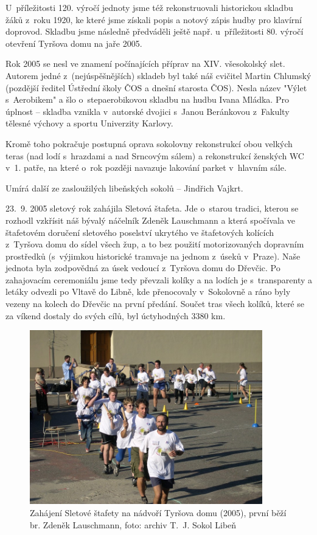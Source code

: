 \documentclass[a5paper, 11pt, twoside]{article}
\begin{document}
U~příležitosti
120. výročí jednoty jsme též rekonstruovali historickou skladbu žáků
z~roku 1920, ke které jsme získali popis a notový zápis hudby pro klavírní
doprovod. Skladbu jsme následně předváděli ještě např. u~příležitosti
80. výročí otevření Tyršova domu na jaře 2005.

Rok 2005 se nesl ve znamení počínajících příprav na XIV. všesokolský
slet. Autorem jedné z~(nejúspěšnějších) skladeb byl také náš cvičitel
Martin Chlumský (pozdější ředitel Ústřední školy ČOS a dnešní starosta
ČOS). Nesla název "Výlet s~Aerobikem" a šlo o~stepaerobikovou skladbu
na hudbu Ivana Mládka. Pro úplnost -- skladba vznikla v~autorské dvojici
s~Janou Beránkovou z~Fakulty tělesné výchovy a sportu Univerzity
Karlovy.

Kromě toho pokračuje postupná oprava sokolovny rekonstrukcí obou velkých
teras (nad lodí s~hrazdami a nad Srncovým sálem) a rekonstrukcí ženských
WC v~1. patře, na které o~rok později navazuje lakování parket v~hlavním
sále.

Umírá další ze zasloužilých libeňských sokolů -- Jindřich Vajkrt.

23.~9. 2005 sletový rok zahájila Sletová štafeta. Jde o~starou tradici,
kterou se rozhodl vzkřísit náš bývalý náčelník Zdeněk Lauschmann a která
spočívala ve štafetovém doručení sletového poselství ukrytého ve
štafetových kolících z~Tyršova domu do sídel všech žup, a to bez použití
motorizovaných dopravním prostředků (s~výjimkou historické tramvaje na
jednom z~úseků v~Praze). Naše jednota byla zodpovědná za úsek vedoucí
z~Tyršova domu do Dřevčic. Po zahajovacím ceremoniálu jsme tedy převzali
kolíky a na lodích je s~transparenty a letáky odvezli po Vltavě do
Libně, kde přenocovaly v~Sokolovně a ráno byly vezeny na kolech do
Dřevčic na první předání. Součet tras všech kolíků, které se za víkend
dostaly do svých cílů, byl úctyhodných 3380 km.

\begin{figure}[h!]
  \centering 
  \includegraphics[width=0.9\textwidth]{img/51_stafeta.jpg}
  \caption*{Zahájení Sletové štafety na nádvoří Tyršova domu (2005), první
  běží br. Zdeněk Lauschmann, foto: archiv T.~J. Sokol Libeň}
\end{figure}
\end{document}
